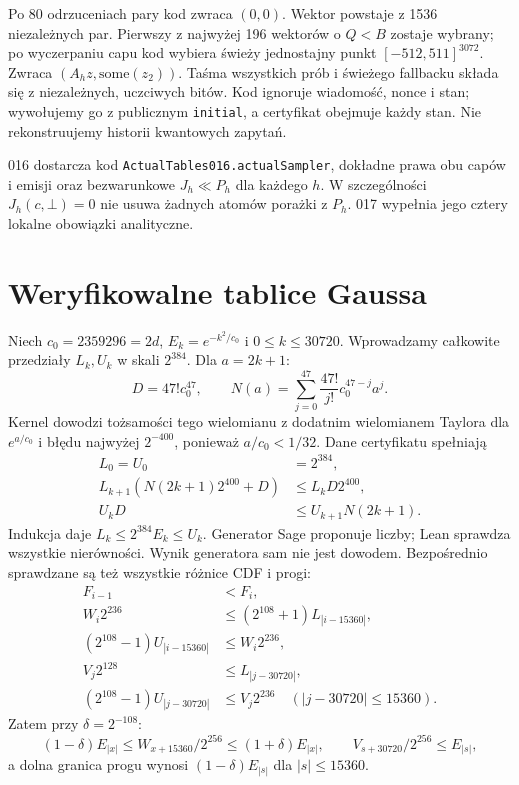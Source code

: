 \documentclass[11pt,a4paper]{article}
\newcommand{\code}[1]{\nolinkurl{#1}}
\begin{document}
Po 80 odrzuceniach pary kod zwraca $(0,0)$. Wektor powstaje z 1536
niezależnych par. Pierwszy z najwyżej 196 wektorów o $Q<B$ zostaje wybrany;
po wyczerpaniu capu kod wybiera świeży jednostajny punkt
$[-512,511]^{3072}$. Zwraca $(A_hz,\mathrm{some}(z_2))$.
Taśma wszystkich prób i świeżego fallbacku składa się z niezależnych,
uczciwych bitów. Kod ignoruje wiadomość, nonce i stan; wywołujemy go z
publicznym \code{initial}, a certyfikat obejmuje każdy stan.
Nie rekonstruujemy historii kwantowych zapytań.

016 dostarcza kod \code{ActualTables016.actualSampler}, dokładne prawa
obu capów i emisji oraz bezwarunkowe $J_h\ll P_h$ dla każdego $h$.
W szczególności $J_h(c,\bot)=0$ nie usuwa żadnych atomów porażki z $P_h$.
017 wypełnia jego cztery lokalne obowiązki analityczne.

\section{Weryfikowalne tablice Gaussa}
Niech $c_0=2359296=2d$, $E_k=e^{-k^2/c_0}$ i $0\le k\le30720$.
Wprowadzamy całkowite przedziały $L_k,U_k$ w skali $2^{384}$.
Dla $a=2k+1$:
\[
 D=47!c_0^{47},\qquad N(a)=\sum_{j=0}^{47}\frac{47!}{j!}c_0^{47-j}a^j.
\]
Kernel dowodzi tożsamości tego wielomianu z dodatnim wielomianem Taylora
dla $e^{a/c_0}$ i błędu najwyżej $2^{-400}$, ponieważ $a/c_0<1/32$.
Dane certyfikatu spełniają
\begin{align*}
 L_0=U_0&=2^{384},\\
 L_{k+1}(N(2k+1)2^{400}+D)&\le L_kD2^{400},\\
 U_kD&\le U_{k+1}N(2k+1).
\end{align*}
Indukcja daje $L_k\le2^{384}E_k\le U_k$. Generator Sage proponuje liczby;
Lean sprawdza wszystkie nierówności. Wynik generatora sam nie jest dowodem.
Bezpośrednio sprawdzane są też wszystkie różnice CDF i progi:
\begin{align*}
 F_{i-1}&<F_i,\\
 W_i2^{236}&\le(2^{108}+1)L_{|i-15360|},\\
 (2^{108}-1)U_{|i-15360|}&\le W_i2^{236},\\
 V_j2^{128}&\le L_{|j-30720|},\\
 (2^{108}-1)U_{|j-30720|}&\le V_j2^{236}\quad(|j-30720|\le15360).
\end{align*}
Zatem przy $\delta=2^{-108}$:
\[
 (1-\delta)E_{|x|}\le W_{x+15360}/2^{256}\le(1+\delta)E_{|x|},
 \qquad V_{s+30720}/2^{256}\le E_{|s|},
\]
a dolna granica progu wynosi $(1-\delta)E_{|s|}$ dla $|s|\le15360$.
\end{document}
